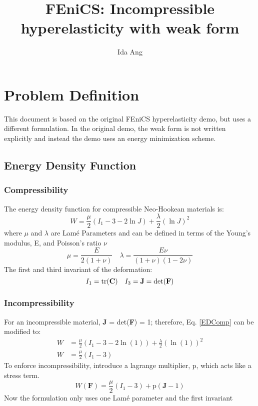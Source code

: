 \documentclass[12pt,3p]{article}
\begin{document}
\title{FEniCS: Incompressible hyperelasticity with weak form \\
	\large{} }
\author{Ida Ang}
\date{\vspace{-5ex}}
\maketitle

\section{Problem Definition}
This document is based on the original FEniCS hyperelasticity demo, but uses a different formulation. In the original demo, the weak form is not written explicitly and instead the demo uses an energy minimization scheme. 

\subsection{Energy Density Function}
\subsubsection{Compressibility}
The energy density function for compressible Neo-Hookean materials is: 
\begin{equation}\label{EDComp}
W = \frac{\mu}{2} (I_1 - 3 - 2 \ln J) + \frac{\lambda}{2} (\ln J)^2
\end{equation}
where $\mu$ and $\lambda$ are Lamé Parameters and can be defined in terms of the Young's modulus, E, and Poisson's ratio $\nu$
\begin{equation}\label{lame}
\mu = \frac{E}{2 (1 + \nu)} \quad \lambda = \frac{E \nu}{(1+ \nu) (1 - 2 \nu)} 
\end{equation}
The first and third invariant of the deformation:
\begin{equation}\label{invariants}
I_1 = \trace(\mathbf{C}) \quad I_3 = \mathbf{J} = \det(\mathbf{F})  
\end{equation}
\subsubsection{Incompressibility}
For an incompressible material, \textbf{J} = det(\textbf{F}) = 1; therefore, Eq. \ref{EDComp} can be modified to: 
\begin{align*}
W &= \frac{\mu}{2} (I_1 - 3 - 2 \ln (1)) + \frac{\lambda}{2} (\ln (1))^2 \\
W &= \frac{\mu}{2} (I_1 - 3) 
\end{align*}
To enforce incompressibility, introduce a lagrange multiplier, p, which acts like a stress term. 
\begin{equation}\label{EnergyDensity}
W(\mathbf{F}) = \frac{\mu}{2} (I_1 - 3) + \text{p} (\mathbf{J}-1) 
\end{equation}
Now the formulation only uses one Lamé parameter and the first invariant
\end{document}
